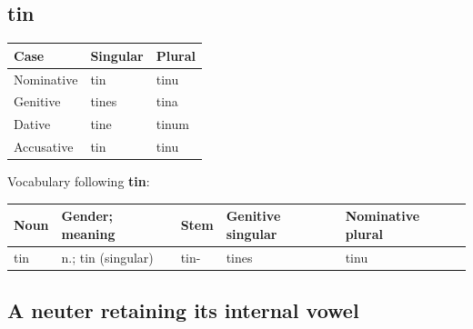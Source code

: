 \subsection*{tin}

\par\begingroup
\fontsize{10.5}{13.2}\selectfont
\setlength{\LTleft}{0pt}\setlength{\LTright}{\fill}
\noindent
\begin{tabular}{@{}>{\raggedright\arraybackslash}p{39.46mm}>{\raggedright\arraybackslash}p{39.46mm}>{\raggedright\arraybackslash}p{39.46mm}@{}}
\toprule
\textbf{Case} & \textbf{Singular} & \textbf{Plural} \\
\midrule
Nominative & tin & tinu \\
Genitive & tines & tina \\
Dative & tine & tinum \\
Accusative & tin & tinu \\
\bottomrule
\end{tabular}
\par\endgroup

Vocabulary following \textbf{tin}:

\par\begingroup
\fontsize{10.5}{13.2}\selectfont
\setlength{\LTleft}{0pt}\setlength{\LTright}{\fill}
\noindent
\begin{tabular}{@{}>{\raggedright\arraybackslash}p{19.18mm}>{\raggedright\arraybackslash}p{26.08mm}>{\raggedright\arraybackslash}p{19.18mm}>{\raggedright\arraybackslash}p{23.11mm}>{\raggedright\arraybackslash}p{25.22mm}@{}}
\toprule
\textbf{Noun} & \textbf{Gender; meaning} & \textbf{Stem} & \textbf{Genitive singular} & \textbf{Nominative plural} \\
\midrule
tin & n.; tin (singular) & tin- & tines & tinu \\
\bottomrule
\end{tabular}
\par\endgroup

\subsection*{A neuter retaining its internal vowel}

